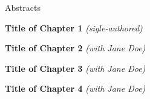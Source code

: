 \begin{center}
\Large Abstracts
\end{center}
\begin{spacing}{1.0}
\noindent \textbf{Title of Chapter 1}\newline
\emph{(sigle-authored)}\newline

\vspace{0.5cm}

\noindent \textbf{Title of Chapter 2}\newline
\emph{(with Jane Doe)}\newline

\vspace{0.5cm}

\noindent \textbf{Title of Chapter 3}\newline
\emph{(with Jane Doe)}\newline

\vspace{0.5cm}

\noindent \textbf{Title of Chapter 4}\newline
\emph{(with Jane Doe)}\newline


\end{spacing}
